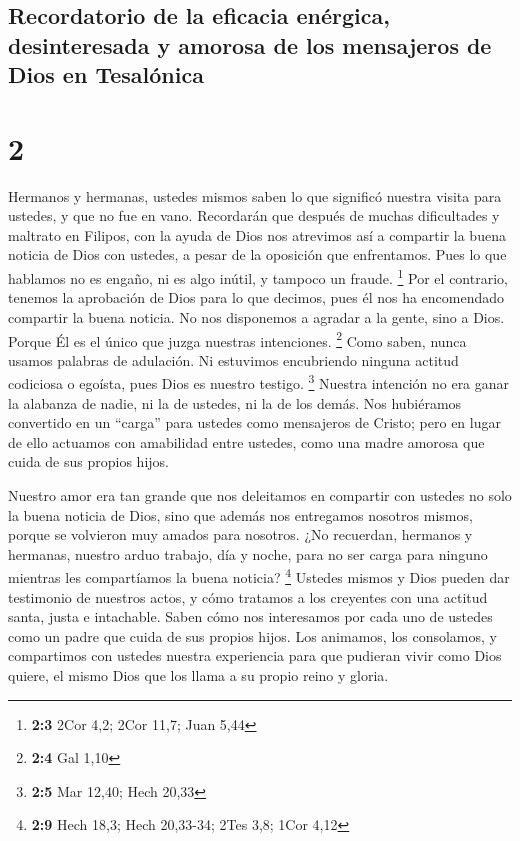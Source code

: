 \hypertarget{recordatorio-de-la-eficacia-enuxe9rgica-desinteresada-y-amorosa-de-los-mensajeros-de-dios-en-tesaluxf3nica}{%
\subsection{Recordatorio de la eficacia enérgica, desinteresada y
amorosa de los mensajeros de Dios en
Tesalónica}\label{recordatorio-de-la-eficacia-enuxe9rgica-desinteresada-y-amorosa-de-los-mensajeros-de-dios-en-tesaluxf3nica}}

\hypertarget{section-1}{%
\section{2}\label{section-1}}

 Hermanos y hermanas, ustedes mismos saben lo que
significó nuestra visita para ustedes, y que no fue en vano.
 Recordarán que después de muchas dificultades y maltrato
en Filipos, con la ayuda de Dios nos atrevimos así a compartir la buena
noticia de Dios con ustedes, a pesar de la oposición que enfrentamos.
 Pues lo que hablamos no es engaño, ni es algo inútil, y
tampoco un fraude. \footnote{\textbf{2:3} 2Cor 4,2; 2Cor 11,7; Juan 5,44}
 Por el contrario, tenemos la aprobación de Dios para lo
que decimos, pues él nos ha encomendado compartir la buena noticia. No
nos disponemos a agradar a la gente, sino a Dios. Porque Él es el único
que juzga nuestras intenciones. \footnote{\textbf{2:4} Gal 1,10}
 Como saben, nunca usamos palabras de adulación. Ni
estuvimos encubriendo ninguna actitud codiciosa o egoísta, pues Dios es
nuestro testigo. \footnote{\textbf{2:5} Mar 12,40; Hech 20,33}
 Nuestra intención no era ganar la alabanza de nadie, ni
la de ustedes, ni la de los demás. Nos hubiéramos convertido en un
``carga'' para ustedes como mensajeros de Cristo;  pero en
lugar de ello actuamos con amabilidad entre ustedes, como una madre
amorosa que cuida de sus propios hijos.

 Nuestro amor era tan grande que nos deleitamos en
compartir con ustedes no solo la buena noticia de Dios, sino que además
nos entregamos nosotros mismos, porque se volvieron muy amados para
nosotros.  ¿No recuerdan, hermanos y hermanas, nuestro
arduo trabajo, día y noche, para no ser carga para ninguno mientras les
compartíamos la buena noticia? \footnote{\textbf{2:9} Hech 18,3; Hech
  20,33-34; 2Tes 3,8; 1Cor 4,12}  Ustedes mismos y Dios
pueden dar testimonio de nuestros actos, y cómo tratamos a los creyentes
con una actitud santa, justa e intachable.  Saben cómo
nos interesamos por cada uno de ustedes como un padre que cuida de sus
propios hijos. Los animamos, los consolamos, y compartimos con ustedes
nuestra experiencia  para que pudieran vivir como Dios
quiere, el mismo Dios que los llama a su propio reino y gloria.

